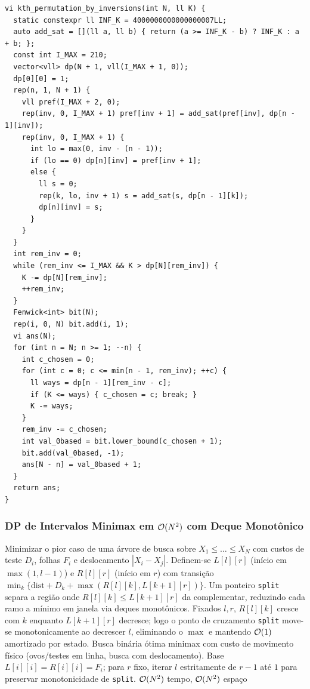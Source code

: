 \begin{lstlisting}
vi kth_permutation_by_inversions(int N, ll K) {
  static constexpr ll INF_K = 4000000000000000007LL;
  auto add_sat = [](ll a, ll b) { return (a >= INF_K - b) ? INF_K : a + b; };
  const int I_MAX = 210;
  vector<vll> dp(N + 1, vll(I_MAX + 1, 0));
  dp[0][0] = 1;
  rep(n, 1, N + 1) {
    vll pref(I_MAX + 2, 0);
    rep(inv, 0, I_MAX + 1) pref[inv + 1] = add_sat(pref[inv], dp[n - 1][inv]);
    rep(inv, 0, I_MAX + 1) {
      int lo = max(0, inv - (n - 1));
      if (lo == 0) dp[n][inv] = pref[inv + 1];
      else {
        ll s = 0;
        rep(k, lo, inv + 1) s = add_sat(s, dp[n - 1][k]);
        dp[n][inv] = s;
      }
    }
  }
  int rem_inv = 0;
  while (rem_inv <= I_MAX && K > dp[N][rem_inv]) {
    K -= dp[N][rem_inv];
    ++rem_inv;
  }
  Fenwick<int> bit(N);
  rep(i, 0, N) bit.add(i, 1);
  vi ans(N);
  for (int n = N; n >= 1; --n) {
    int c_chosen = 0;
    for (int c = 0; c <= min(n - 1, rem_inv); ++c) {
      ll ways = dp[n - 1][rem_inv - c];
      if (K <= ways) { c_chosen = c; break; }
      K -= ways;
    }
    rem_inv -= c_chosen;
    int val_0based = bit.lower_bound(c_chosen + 1);
    bit.add(val_0based, -1);
    ans[N - n] = val_0based + 1;
  }
  return ans;
}
\end{lstlisting}

\subsubsection{DP de Intervalos Minimax em $\mathcal{O}(N^2)$ com Deque Monotônico}
\algobox
  {Minimizar o pior caso de uma árvore de busca sobre $X_1 \le \dots \le X_N$ com custos de teste $D_i$, folhas $F_i$ e deslocamento $|X_i - X_j|$.}
  {Definem-se $L[l][r]$ (início em $\max(1, l-1)$) e $R[l][r]$ (início em $r$) com transição $\min_k \{\text{dist} + D_k + \max(R[l][k], L[k+1][r])\}$. Um ponteiro \texttt{split} separa a região onde $R[l][k] \le L[k+1][r]$ da complementar, reduzindo cada ramo a mínimo em janela via deques monotônicos.}
  {Fixados $l, r$, $R[l][k]$ cresce com $k$ enquanto $L[k+1][r]$ decresce; logo o ponto de cruzamento \texttt{split} move-se monotonicamente ao decrescer $l$, eliminando o $\max$ e mantendo $\mathcal{O}(1)$ amortizado por estado.}
  {Busca binária ótima minimax com custo de movimento físico (ovos/testes em linha, busca com deslocamento).}
  {Base $L[i][i] = R[i][i] = F_i$; para $r$ fixo, iterar $l$ estritamente de $r - 1$ até $1$ para preservar monotonicidade de \texttt{split}.}
  {$\mathcal{O}(N^2)$ tempo, $\mathcal{O}(N^2)$ espaço}

